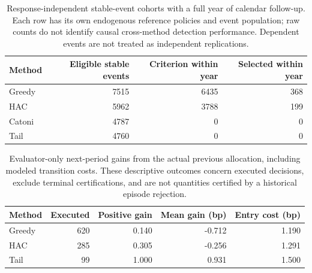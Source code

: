 \begin{table}[H]\centering\small

\begin{tabular}{lrrr}

\toprule

Method & Eligible stable events & Criterion within year & Selected within year \\

\midrule

Greedy & 7515 & 6435 & 368 \\

HAC & 5962 & 3788 & 199 \\

Catoni & 4787 & 0 & 0 \\

Tail & 4760 & 0 & 0 \\

\bottomrule\end{tabular}

\caption{Response-independent stable-event cohorts with a full year of calendar follow-up. Each row has its own endogenous reference policies and event population; raw counts do not identify causal cross-method detection performance. Dependent events are not treated as independent replications.}\end{table}

\begin{table}[H]\centering\small

\begin{tabular}{lrrrr}

\toprule

Method & Executed & Positive gain & Mean gain (bp) & Entry cost (bp) \\

\midrule

Greedy & 620 & 0.140 & -0.712 & 1.190 \\

HAC & 285 & 0.305 & -0.256 & 1.291 \\

Tail & 99 & 1.000 & 0.931 & 1.500 \\

\bottomrule\end{tabular}

\caption{Evaluator-only next-period gains from the actual previous allocation, including modeled transition costs. These descriptive outcomes concern executed decisions, exclude terminal certifications, and are not quantities certified by a historical episode rejection.}\end{table}

